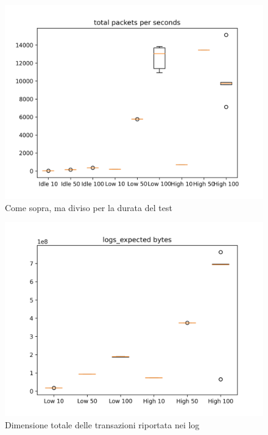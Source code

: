 \documentclass[12pt, a4paper]{article}
\begin{document}
\begin{figure}[H]
    \includegraphics[width=\linewidth, height=0.4\textheight, keepaspectratio]{graphs/total packets per seconds.png}
    \caption{Come sopra, ma diviso per la durata del test}
    \label{fig:tpps}
\end{figure}

\begin{figure}[H]
    \includegraphics[width=\linewidth, height=0.4\textheight, keepaspectratio]{graphs/logs_expected bytes.png}
    \caption{Dimensione totale delle transazioni riportata nei log}
    \label{fig:leb}
\end{figure}
\end{document}
